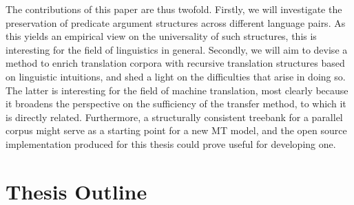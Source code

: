 \documentclass{report}
\begin{document}
The contributions of this paper are thus twofold. Firstly, we will investigate the preservation of predicate argument structures across different language pairs. As this yields an empirical view on the universality of such structures, this is interesting for the field of linguistics in general. Secondly, we will aim to devise a method to enrich translation corpora with recursive translation structures based on linguistic intuitions, and shed a light on the difficulties that arise in doing so. The latter is interesting for the field of machine translation, most clearly because it broadens the perspective on the sufficiency of the transfer method, to which it is directly related. Furthermore, a structurally consistent treebank for a parallel corpus might serve as a starting point for a new MT model, and the open source implementation produced for this thesis could prove useful for developing one.


\section*{Thesis Outline}


\end{document}
